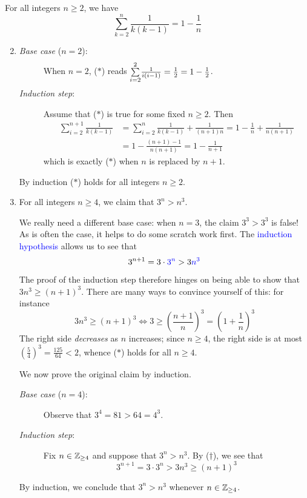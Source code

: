 \begin{examples}{}{}
	\exstart For all integers $n\ge 2$, we have\footnotemark
	\[
		\sum\limits_{k=2}^n\frac 1{k(k-1)} =1-\frac 1n\tag{$\ast$}
	\]	
	\begin{enumerate}\setcounter{enumi}{1}
		\item[]\begin{description}
			\item[\normalfont\emph{Base case} ($n=2$):] When $n=2$, ($\ast$) reads $\smash{\sum\limits_{i=2}^2}\frac 1{i(i-1)}=\frac 12=1-\frac 12$.
			\item[\normalfont\emph{Induction step}:] Assume that ($\ast$) is true for some fixed $n\ge 2$. Then
			\begin{align*}
				\sum_{i=2}^{n+1}\frac 1{k(k-1)} &=\sum_{i=2}^{n}\frac 1{k(k-1)}+\frac 1{(n+1)n} =1-\frac 1n+\frac 1{n(n+1)}\tag{induction hypothesis}\\
				&=1-\frac{(n+1)-1}{n(n+1)} =1-\frac 1{n+1}
			\end{align*}
			which is exactly ($\ast$) when $n$ is replaced by $n+1$.
		\end{description}
		By induction ($\ast$) holds for all integers $n\ge 2$.
	
	  \item For all integers $n\ge 4$, we claim that $3^n>n^3$.\par
	  We really need a different base case: when $n=3$, the claim $3^3>3^3$ is false! As is often the case, it helps to do some scratch work first. The \textcolor{blue}{induction hypothesis} allows us to see that 
	  \[
	  	3^{n+1}=3\cdot \textcolor{blue}{3^n} >3 \textcolor{blue}{n^3}
	  \] 
	  The proof of the induction step therefore hinges on being able to show that $3n^3\ge (n+1)^3$. There are many ways to convince yourself of this: for instance
	  \[
	  	3n^3\ge(n+1)^3\iff 3\ge\left(\frac{n+1}n\right)^3 =\left(1+\frac 1n\right)^3 \tag{$\dag$}
	  \]
	  The right side \emph{decreases} as $n$ increases; since $n\ge 4$, the right side is at most $\left(\frac 54\right)^3=\frac{125}{64}<2$, whence ($\ast$) holds for all $n\ge 4$.\smallbreak
	  
	  We now prove the original claim by induction.	  
	  \begin{description}
	  	\item[\normalfont\emph{Base case} ($n=4$):] Observe that $3^4=81>64=4^3$.
	  	\item[\normalfont\emph{Induction step}:] Fix $n\in\mathbb{Z}_{\ge 4}$ and suppose that $3^n>n^3$. By ($\dag$), we see that
			\[
				3^{n+1}=3\cdot 3^n>3n^3\ge (n+1)^3
			\]
	  \end{description}
	  By induction, we conclude that $3^n>n^3$ whenever $n\in\mathbb{Z}_{\ge 4}$.
	\end{enumerate}
\end{examples}


